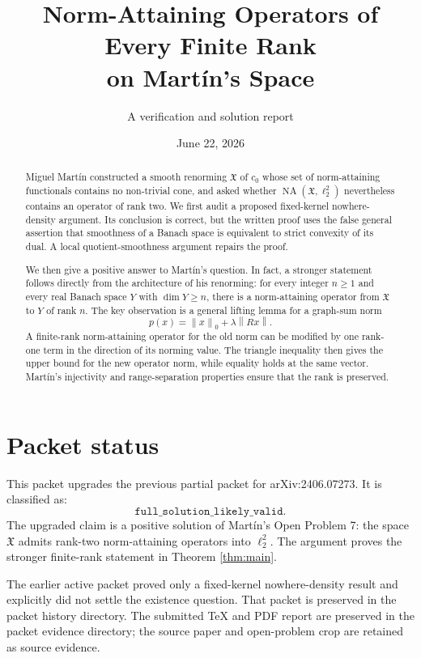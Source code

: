 \documentclass[11pt]{article}
\title{Norm-Attaining Operators of Every Finite Rank\\on Mart\'in's Space}
\author{A verification and solution report}
\date{June 22, 2026}
\theoremstyle{definition}
\newcommand{\NA}{\operatorname{NA}}
\newcommand{\X}{\mathfrak X}
\newcommand{\norm}[1]{\left\lVert #1\right\rVert}
\begin{document}
\maketitle

\section*{Packet status}

This packet upgrades the previous partial packet for arXiv:2406.07273.  It is
classified as:
\[
  \texttt{full\_solution\_likely\_valid}.
\]
The upgraded claim is a positive solution of Mart\'in's Open Problem 7: the
space \(\X\) admits rank-two norm-attaining operators into \(\ell_2^2\).  The
argument proves the stronger finite-rank statement in Theorem \ref{thm:main}.

The earlier active packet proved only a fixed-kernel nowhere-density result and
explicitly did not settle the existence question.  That packet is preserved in
the packet history directory.  The submitted TeX and PDF report are preserved
in the packet evidence directory; the source paper and open-problem crop are
retained as source evidence.

\begin{abstract}
Miguel Mart\'in constructed a smooth renorming \(\X\) of \(c_0\) whose set of
norm-attaining functionals contains no non-trivial cone, and asked whether
\(\NA(\X,\ell_2^2)\) nevertheless contains an operator of rank two.  We first
audit a proposed fixed-kernel nowhere-density argument.  Its conclusion is
correct, but the written proof uses the false general assertion that smoothness
of a Banach space is equivalent to strict convexity of its dual.  A local
quotient-smoothness argument repairs the proof.

We then give a positive answer to Mart\'in's question.  In fact, a stronger
statement follows directly from the architecture of his renorming: for every
integer \(n\geq 1\) and every real Banach space \(Y\) with
\(\dim Y\geq n\), there is a norm-attaining operator from \(\X\) to \(Y\) of
rank \(n\).  The key observation is a general lifting lemma for a graph-sum
norm
\[
       p(x)=\norm{x}_0+\lambda\norm{Rx}.
\]
A finite-rank norm-attaining operator for the old norm can be modified by one
rank-one term in the direction of its norming value.  The triangle inequality
then gives the upper bound for the new operator norm, while equality holds at
the same vector.  Mart\'in's injectivity and range-separation properties ensure
that the rank is preserved.
\end{abstract}
\end{document}
